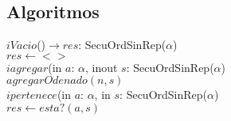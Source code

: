 \subsection*{Algoritmos}

$iVacio$()$\longrightarrow res$: SecuOrdSinRep($\alpha$)\\
$res\longleftarrow <>$\\

$iagregar$(in $a$: $\alpha$, inout $s$: SecuOrdSinRep($\alpha$)\\
$agregarOdenado(n,s)$\\

$ipertenece$(in $a$: $\alpha$, in $s$: SecuOrdSinRep($\alpha$)\\
$res\longleftarrow esta?(a,s)$\\